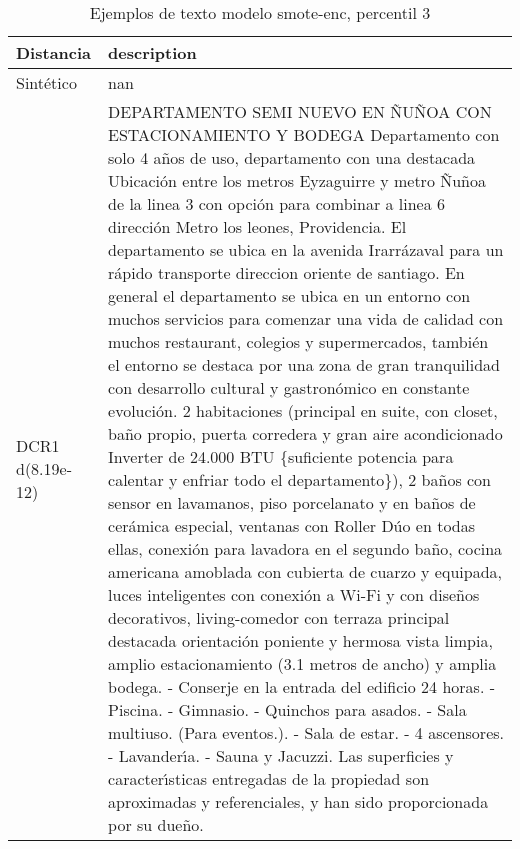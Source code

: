\begin{table}[H]
\centering
\fontsize{10}{14}\selectfont
\caption{Ejemplos de texto modelo smote-enc, percentil 3}
\label{table-example-economicos-a-2-smote-enc-3p-text}
\begin{tabular}{|l|m{35em}|}
\hline
\rowcolor[gray]{0.8}
Distancia & description \\
\hline Sintético & nan \\
\hline DCR1 d(8.19e-12) & DEPARTAMENTO SEMI NUEVO EN \~NU\~NOA CON ESTACIONAMIENTO Y BODEGA  Departamento con solo 4 a\~nos de uso, departamento con una destacada Ubicaci\'on entre los metros Eyzaguirre y metro \~Nu\~noa de la linea 3 con opci\'on para combinar a linea 6 direcci\'on Metro los leones, Providencia. El departamento se ubica en la avenida Irarr\'azaval para un r\'apido transporte direccion oriente de santiago.  En general el departamento se ubica en un entorno con muchos servicios para comenzar una vida de calidad con muchos restaurant, colegios y supermercados, tambi\'en el entorno se destaca por una zona de gran tranquilidad con desarrollo cultural y gastron\'omico en constante evoluci\'on.   2 habitaciones (principal en suite, con closet, ba\~no propio, puerta corredera y gran aire acondicionado Inverter de 24.000 BTU \{suficiente potencia para calentar y enfriar todo el departamento\}), 2 ba\~nos con sensor en lavamanos, piso porcelanato y en ba\~nos de cer\'amica especial, ventanas con Roller D\'uo en todas ellas, conexi\'on para lavadora en el segundo ba\~no, cocina americana amoblada con cubierta de cuarzo y equipada, luces inteligentes con conexi\'on a Wi-Fi y con dise\~nos decorativos, living-comedor con terraza principal destacada orientaci\'on poniente y hermosa vista limpia, amplio estacionamiento (3.1 metros de ancho) y amplia bodega.   - Conserje en la entrada del edificio 24 horas. - Piscina. - Gimnasio. - Quinchos para asados. - Sala multiuso. (Para eventos.). - Sala de estar. - 4 ascensores. - Lavander{\'\i}a. - Sauna y Jacuzzi.   Las superficies y caracter{\'\i}sticas entregadas de la propiedad son aproximadas y referenciales, y han sido proporcionada por su due\~no. \\

\end{tabular}
\end{table}
